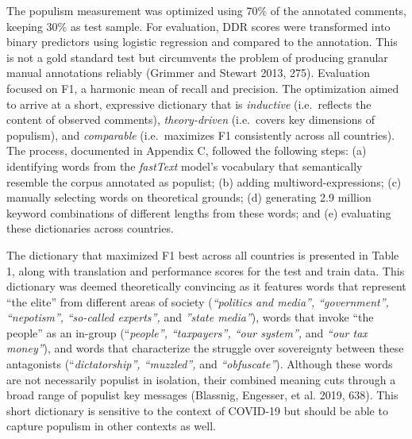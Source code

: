 \documentclass[
]{ccr}
\begin{document}
The populism measurement was optimized using 70\% of the annotated
comments, keeping 30\% as test sample. For evaluation, DDR scores were
transformed into binary predictors using logistic regression and
compared to the annotation. This is not a gold standard test but
circumvents the problem of producing granular manual annotations
reliably (Grimmer and Stewart 2013, 275). Evaluation focused on F1, a
harmonic mean of recall and precision. The optimization aimed to arrive
at a short, expressive dictionary that is \emph{inductive}
(i.e.~reflects the content of observed comments), \emph{theory-driven}
(i.e.~covers key dimensions of populism), and \emph{comparable}
(i.e.~maximizes F1 consistently across all countries). The process,
documented in Appendix C, followed the following steps: (a) identifying
words from the \emph{fastText} model's vocabulary that semantically
resemble the corpus annotated as populist; (b) adding
multiword-expressions; (c) manually selecting words on theoretical
grounds; (d) generating 2.9 million keyword combinations of different
lengths from these words; and (e) evaluating these dictionaries across
countries.

The dictionary that maximized F1 best across all countries is presented
in Table 1, along with translation and performance scores for the test
and train data. This dictionary was deemed theoretically convincing as
it features words that represent ``the elite'' from different areas of
society (\emph{``politics and media'', ``government'', ``nepotism'',}
\emph{``so-called experts'',} and \emph{''state media''}), words that
invoke ``the people'' as an in-group (``\emph{people'', ``taxpayers'',
``our system'',} and \emph{``our tax money''}), and words that
characterize the struggle over sovereignty between these antagonists
(``\emph{dictatorship'', ``muzzled'',} and \emph{``obfuscate''}).
Although these words are not necessarily populist in isolation, their
combined meaning cuts through a broad range of populist key messages
(Blassnig, Engesser, et al. 2019, 638). This short dictionary is
sensitive to the context of COVID-19 but should be able to capture
populism in other contexts as well.
\end{document}
